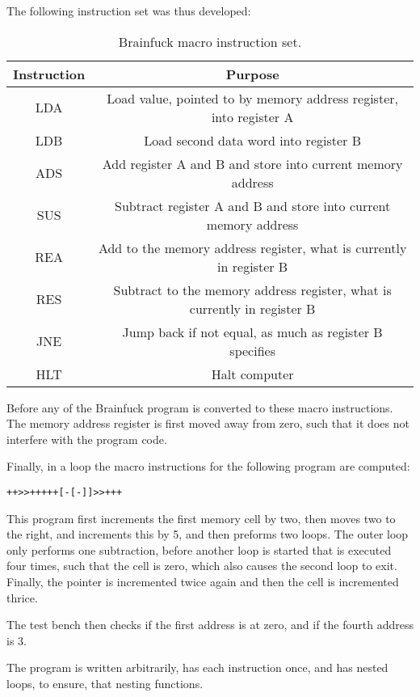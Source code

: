 The following instruction set was thus developed:
\begin{table}[]
    \begin{centering}
    \begin{tabular}{cc}
    Instruction & Purpose                                                                  \\ \hline
    LDA         & Load value, pointed to by memory address register, into register A       \\
    LDB         & Load second data word into register B                                    \\
    ADS         & Add register A and B and store into current memory address               \\
    SUS         & Subtract register A and B and store into current memory address          \\
    REA         & Add to the memory address register, what is currently in register B      \\
    RES         & Subtract to the memory address register, what is currently in register B \\
    JNE         & Jump back if not equal, as much as register B specifies                  \\
    HLT         & Halt computer                                                           
    \end{tabular}
\end{centering}
    \caption{Brainfuck macro instruction set.}
    \label{tab:brainfuck-macro-instructions}
    \end{table}

Before any of the Brainfuck program is converted to these macro instructions. The memory address register is first moved away from zero, such that it does not interfere with the program code.

Finally, in a loop the macro instructions for the following program are computed: 

\begin{lstlisting}[caption=Brainfuck program, label=lst:brainfuck]
    ++>>+++++[-[-]]>>+++
\end{lstlisting}

This program first increments the first memory cell by two, then moves two to the right, and increments this by 5, and then preforms two loops. The outer loop only performs one subtraction, before another loop is started that is executed four times, such that the cell is zero, which also causes the second loop to exit. Finally, the pointer is incremented twice again and then the cell is incremented thrice. 

The test bench then checks if the first address is at zero, and if the fourth address is 3.

The program is written arbitrarily, has each instruction once, and has nested loops, to ensure, that nesting functions. 


